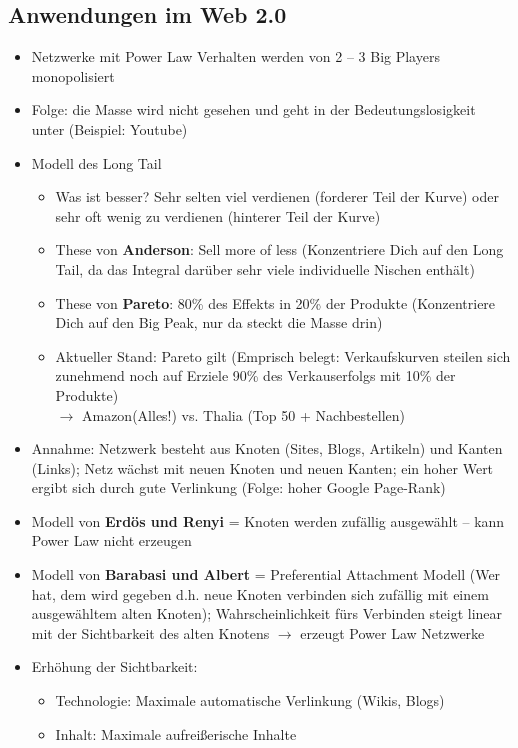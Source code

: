 \documentclass{article} %
\begin{document}
	\subsection{Anwendungen im Web 2.0}
	\begin{itemize}
		\item Netzwerke mit Power Law Verhalten werden von 2 – 3 Big Players monopolisiert
		\item Folge: die Masse wird nicht gesehen und geht in der Bedeutungslosigkeit unter (Beispiel: Youtube)
		\item Modell des Long Tail
		\begin{itemize}
			\item Was ist besser? Sehr selten viel verdienen (forderer Teil der Kurve) oder sehr oft wenig zu verdienen (hinterer Teil der Kurve)
			\item These von \textbf{Anderson}: Sell more of less (Konzentriere Dich auf den Long Tail, da das Integral darüber sehr viele individuelle Nischen enthält)
			\item These von \textbf{Pareto}: 80\% des Effekts in 20\% der Produkte (Konzentriere Dich auf den Big Peak, nur da steckt die Masse drin) 
			\item Aktueller Stand: Pareto gilt (Emprisch belegt: Verkaufskurven steilen sich zunehmend noch auf
			Erziele 90\% des Verkauserfolgs mit 10\% der Produkte)\\		$\rightarrow$ Amazon(Alles!) vs. Thalia (Top 50 + Nachbestellen)
		\end{itemize}
		\item Annahme: Netzwerk besteht aus Knoten (Sites, Blogs, Artikeln) und Kanten (Links); Netz wächst mit neuen Knoten und neuen Kanten; ein hoher Wert ergibt sich durch gute Verlinkung (Folge: hoher Google Page-Rank)
		\item Modell von \textbf{Erdös und Renyi} = Knoten werden zufällig ausgewählt – kann Power Law nicht erzeugen
		\item Modell von \textbf{Barabasi und Albert} = Preferential Attachment Modell (Wer hat, dem wird gegeben d.h. neue Knoten verbinden sich zufällig mit einem ausgewähltem alten Knoten); Wahrscheinlichkeit fürs Verbinden steigt linear mit der Sichtbarkeit des alten Knotens $\rightarrow$ erzeugt Power Law Netzwerke
		\item Erhöhung der Sichtbarkeit:
		\begin{itemize}
			\item Technologie: Maximale automatische Verlinkung (Wikis, Blogs)
			\item Inhalt: Maximale aufreißerische Inhalte

\end{itemize}
\end{itemize}
\end{document}
